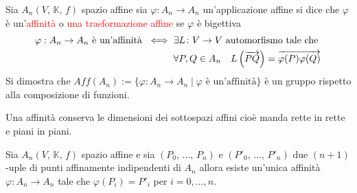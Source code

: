         \begin{richiamo}
        Sia $A_n\left(V, \, \mathbb{K}, \,f \right)$ spazio affine sia $\varphi \colon A_n \to A_n$ un'applicazione affine 
        si dice che $\varphi$ è un'\textcolor{red}{affinità} o \textcolor{red}{una trasformazione affine} se $\varphi$ è \textcolor{celeste}{bigettiva}
        \begin{align}
        \varphi : A_n \to A_n \text{ è un'affinità } \iff {} & \exists L \colon V \to V \text{ automorfismo tale che } \notag \\
        & \forall P,Q \in A_n \quad L\left(\overrightarrow{PQ}\right) = \overrightarrow{\varphi(P)\varphi(Q)} \label{eq:condizione_affinita}
        \end{align}
        Si dimostra che $Aff(A_n):= \{\varphi: A_n \to A_n \mid \varphi \text{ è un'affinità}\}$ è un gruppo rispetto alla composizione di funzioni.

        Una affinità conserva le dimensioni dei sottospazi affini cioè manda rette in rette e piani in piani.
        \end{richiamo}
        \begin{richiamo}
        \mbox{}

        Sia $A_n\left(V, \, \mathbb{K}, \,f \right)$ spazio affine e sia $\left(P_0, \, \dots , \, P_n\right)$ e $\left(P'_0, \, \dots , \, P'_n\right)$ due
        $(n+1)$-uple di punti affinamente indipendenti di $A_n$  allora esiste un'unica affinità $\varphi: A_n \to A_n$ tale che $\varphi(P_i) = P'_i$ per $i=0,\ldots,n$.
        \end{richiamo}

